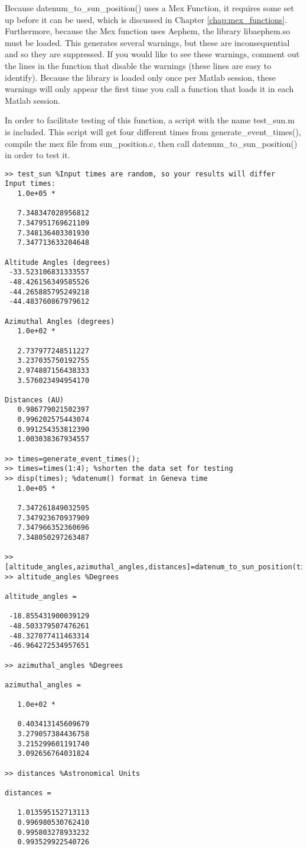 \documentclass[12pt]{report}
\begin{document}
Because datenum\_to\_sun\_position() uses a Mex Function, it requires some set up before it can be used, which is discussed in Chapter \ref{chap:mex_functions}.  Furthermore, because the Mex function uses Aephem, the library libaephem.so must be loaded.  This generates several warnings, but these are inconsequential and so they are suppressed.  If you would like to see these warnings, comment out the lines in the function that disable the warnings (these lines are easy to identify).  Because the library is loaded only once per Matlab session, these warnings will only appear the first time you call a function that loads it in each Matlab session.

In order to facilitate testing of this function, a script with the name test\_sun.m is included.  This script will get four different times from generate\_event\_times(), compile the mex file from sun\_position.c, then call datenum\_to\_sun\_position() in order to test it.

\begin{verbatim}
>> test_sun %Input times are random, so your results will differ
Input times:
   1.0e+05 *

   7.348347028956812
   7.347951769621109
   7.348136403301930
   7.347713633204648

Altitude Angles (degrees)
 -33.523106831333557
 -48.426156349585526
 -44.265885795249218
 -44.483760867979612

Azimuthal Angles (degrees)
   1.0e+02 *

   2.737977248511227
   3.237035750192755
   2.974887156438333
   3.576023494954170

Distances (AU)
   0.986779021502397
   0.996202575443074
   0.991254353812390
   1.003038367934557

>> times=generate_event_times();
>> times=times(1:4); %shorten the data set for testing
>> disp(times); %datenum() format in Geneva time
   1.0e+05 *

   7.347261849032595
   7.347923670937909
   7.347966352360696
   7.348050297263487
 
>> [altitude_angles,azimuthal_angles,distances]=datenum_to_sun_position(times);
>> altitude_angles %Degrees

altitude_angles =

 -18.855431900039129
 -48.503379507476261
 -48.327077411463314
 -46.964272534957651

>> azimuthal_angles %Degrees

azimuthal_angles =

   1.0e+02 *

   0.403413145609679
   3.279057384436758
   3.215299601191740
   3.092656764031824

>> distances %Astronomical Units

distances =

   1.013595152713113
   0.996980530762410
   0.995803278933232
   0.993529922540726

\end{verbatim}
\end{document}
